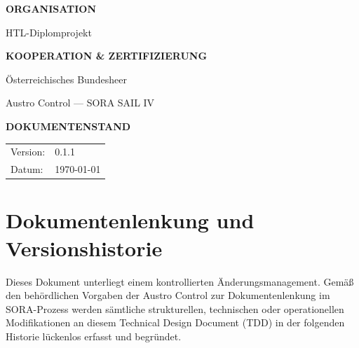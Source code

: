 \documentclass[12pt,a4paper,oneside]{report}
\begin{document}
\begin{titlepage}
\begin{minipage}[t]{0.5\textwidth}
        {\footnotesize\color{AerospaceNavy}\uppercase{\textbf{Organisation}}\par}
        \vspace{0.1cm}
        HTL-Diplomprojekt\par
    \end{minipage}
    \begin{minipage}[t]{0.45\textwidth}
        {\footnotesize\color{AerospaceNavy}\uppercase{\textbf{Kooperation \& Zertifizierung}}\par}
        \vspace{0.1cm}
        Österreichisches Bundesheer\par
        Austro Control --- SORA SAIL IV\par
        
        \vspace{0.6cm} %
        
        {\footnotesize\color{AerospaceNavy}\uppercase{\textbf{Dokumentenstand}}\par}
        \vspace{0.1cm}
        \begin{tabular}{ll}
            Version: & 0.1.1 \\
            Datum:   & \today \\
        \end{tabular}
    \end{minipage}

    \vspace*{1cm}
\end{titlepage}

\chapter*{Dokumentenlenkung und Versionshistorie}

Dieses Dokument unterliegt einem kontrollierten Änderungsmanagement. Gemäß den behördlichen Vorgaben der Austro Control zur Dokumentenlenkung im SORA-Prozess werden sämtliche strukturellen, technischen oder operationellen Modifikationen an diesem Technical Design Document (TDD) in der folgenden Historie lückenlos erfasst und begründet.

\vspace{0.3cm}
\end{document}
